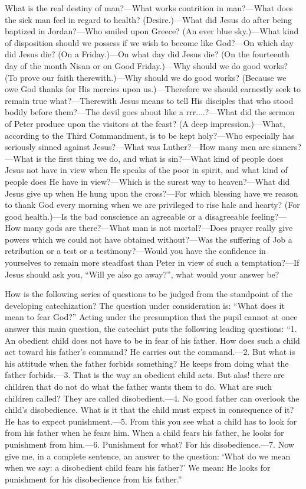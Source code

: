 What is the real destiny of man?—What works contrition in man?—What does the sick man feel in regard to health? (Desire.)—What did Jesus do after being baptized in Jordan?—Who smiled upon Greece? (An ever blue sky.)—What kind of disposition should we possess if we wish to become like God?—On which day did Jesus die? (On a Friday.)—On what day did Jesus die? (On the fourteenth day of the month Nisan or on Good Friday.)—Why should we do good works? (To prove our faith therewith.)—Why should we do good works? (Because we owe God thanks for His mercies upon us.)—Therefore we should earnestly seek to remain true what?—Therewith Jesus means to tell His disciples that who stood bodily before them?—The devil goes about like a rrr....?—What did the sermon of Peter produce upon the visitors at the feast? (A deep impression.)—What, according to the Third Commandment, is to be kept holy?—Who especially has seriously sinned against Jesus?—What was Luther?—How many men are sinners?—What is the first thing we do, and what is sin?—What kind of people does Jesus not have in view when He speaks of the poor in spirit, and what kind of people does He have in view?—Which is the surest way to heaven?—What did Jesus give up when He hung upon the cross?—For which blessing have we reason to thank God every morning when we are privileged to rise hale and hearty? (For good health.)—Is the bad conscience an agreeable or a disagreeable feeling?—How many gods are there?—What man is not mortal?—Does prayer really give powers which we could not have obtained without?—Was the suffering of Job a retribution or a test or a testimony?—Would you have the confidence in yourselves to remain more steadfast than Peter in view of such a temptation?—If Jesus should ask you, “Will ye also go away?”, what would your answer be?

How is the following series of questions to be judged from the standpoint of the developing catechization? The question under consideration is: “What does it mean to fear God?” Acting under the presumption that the pupil cannot at once answer this main question, the catechist puts the following leading questions: “1. An obedient child does not have to be in fear of his father. How does such a child act toward his father’s command? He carries out the command.—2. But what is his attitude when the father forbids something? He keeps from doing what the father forbids.—3. That is the way an obedient child acts. But alas! there are children that do not do what the father wants them to do. What are such children called? They are called disobedient.—4. No good father can overlook the child’s disobedience. What is it that the child must expect in consequence
of it? He has to expect punishment.—5. From this you see what a child has to look for from his father when he fears him. When a child fears his father, he looks for punishment from him.—6. Punishment for what? For his disobedience.—7. Now give me, in a complete sentence, an answer to the question: ‘What do we mean when we say: a disobedient child fears his father?’ We mean: He looks for punishment for his disobedience from his father.”

